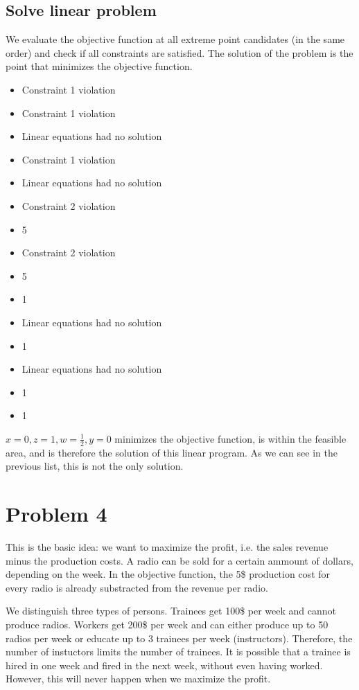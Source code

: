 \documentclass[12pt]{article}
\begin{document}
\subsection*{Solve linear problem}
We evaluate the objective function at all extreme point candidates (in the same order) and check if all constraints are satisfied. The solution of the problem is the point that minimizes the objective function.

\begin{itemize}
	\item Constraint 1 violation
	\item Constraint 1 violation
	\item Linear equations had no solution
	\item Constraint 1 violation
	\item Linear equations had no solution
	\item Constraint 2 violation
	\item 5
	\item Constraint 2 violation
	\item 5
	\item 1
	\item Linear equations had no solution
	\item 1
	\item Linear equations had no solution
	\item 1
	\item 1
\end{itemize}

$x=0, z=1, w=\frac{1}{2}, y=0$ minimizes the objective function, is within the feasible area, and is therefore the solution of this linear program. As we can see in the previous list, this is not the only solution.

\section*{Problem 4}
This is the basic idea: we want to maximize the profit, i.e. the sales revenue minus the production costs. A radio can be sold for a certain ammount of dollars, depending on the week. In the objective function, the 5\$ production cost for every radio is already substracted from the revenue per radio.

We distinguish three types of persons. Trainees get 100\$ per week and cannot produce radios. Workers get 200\$ per week and can either produce up to 50 radios per week or educate up to 3 trainees per week (instructors). Therefore, the number of instuctors limits the number of trainees. It is possible that a trainee is hired in one week and fired in the next week, without even having worked. However, this will never happen when we maximize the profit.
\end{document}
